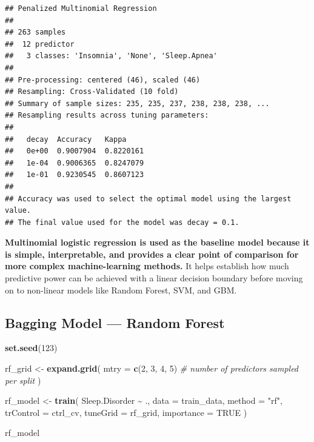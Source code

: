 \documentclass[
]{article}
\newenvironment{Shaded}{\begin{snugshade}}{\end{snugshade}}
\newcommand{\AttributeTok}[1]{\textcolor[rgb]{0.13,0.29,0.53}{#1}}
\newcommand{\CommentTok}[1]{\textcolor[rgb]{0.56,0.35,0.01}{\textit{#1}}}
\newcommand{\ConstantTok}[1]{\textcolor[rgb]{0.56,0.35,0.01}{#1}}
\newcommand{\DecValTok}[1]{\textcolor[rgb]{0.00,0.00,0.81}{#1}}
\newcommand{\FunctionTok}[1]{\textcolor[rgb]{0.13,0.29,0.53}{\textbf{#1}}}
\newcommand{\NormalTok}[1]{#1}
\newcommand{\OtherTok}[1]{\textcolor[rgb]{0.56,0.35,0.01}{#1}}
\newcommand{\SpecialCharTok}[1]{\textcolor[rgb]{0.81,0.36,0.00}{\textbf{#1}}}
\newcommand{\StringTok}[1]{\textcolor[rgb]{0.31,0.60,0.02}{#1}}
\begin{document}
\begin{verbatim}
## Penalized Multinomial Regression 
## 
## 263 samples
##  12 predictor
##   3 classes: 'Insomnia', 'None', 'Sleep.Apnea' 
## 
## Pre-processing: centered (46), scaled (46) 
## Resampling: Cross-Validated (10 fold) 
## Summary of sample sizes: 235, 235, 237, 238, 238, 238, ... 
## Resampling results across tuning parameters:
## 
##   decay  Accuracy   Kappa    
##   0e+00  0.9007904  0.8220161
##   1e-04  0.9006365  0.8247079
##   1e-01  0.9230545  0.8607123
## 
## Accuracy was used to select the optimal model using the largest value.
## The final value used for the model was decay = 0.1.
\end{verbatim}

\textbf{Multinomial logistic regression is used as the baseline model
because it is simple, interpretable, and provides a clear point of
comparison for more complex machine-learning methods.} It helps
establish how much predictive power can be achieved with a linear
decision boundary before moving on to non-linear models like Random
Forest, SVM, and GBM.

\subsection{Bagging Model --- Random
Forest}\label{bagging-model-random-forest}

\begin{Shaded}
\begin{Highlighting}[]
\FunctionTok{set.seed}\NormalTok{(}\DecValTok{123}\NormalTok{)}

\NormalTok{rf\_grid }\OtherTok{\textless{}{-}} \FunctionTok{expand.grid}\NormalTok{(}
  \AttributeTok{mtry =} \FunctionTok{c}\NormalTok{(}\DecValTok{2}\NormalTok{, }\DecValTok{3}\NormalTok{, }\DecValTok{4}\NormalTok{, }\DecValTok{5}\NormalTok{)  }\CommentTok{\# number of predictors sampled per split}
\NormalTok{)}

\NormalTok{rf\_model }\OtherTok{\textless{}{-}} \FunctionTok{train}\NormalTok{(}
\NormalTok{  Sleep.Disorder }\SpecialCharTok{\textasciitilde{}}\NormalTok{ .,}
  \AttributeTok{data =}\NormalTok{ train\_data,}
  \AttributeTok{method =} \StringTok{"rf"}\NormalTok{,}
  \AttributeTok{trControl =}\NormalTok{ ctrl\_cv,}
  \AttributeTok{tuneGrid =}\NormalTok{ rf\_grid,}
  \AttributeTok{importance =} \ConstantTok{TRUE}
\NormalTok{)}

\NormalTok{rf\_model}
\end{Highlighting}
\end{Shaded}
\end{document}
